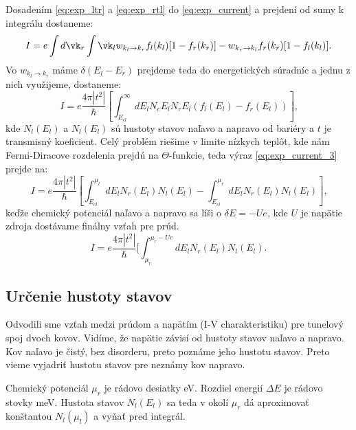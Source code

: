 Dosadením \eqref{eq:exp_ltr} a \eqref{eq:exp_rtl} do \eqref{eq:exp_current} a prejdení od sumy k integrálu dostaneme:
\begin{equation}
\label{eq:exp_current_2}
I=e\int d\vk_r \int \vk_l w_{k_l\to k_r} f_l(k_l)[1-f_r(k_r)] -  w_{k_r\to k_l} f_r(k_r)[1-f_l(k_l)]\text{.}
\end{equation} 
Vo $w_{k_l\to k_r}$ máme $\delta(E_l-E_r)$ prejdeme teda do energetických súradníc a jednu z nich využijeme,
dostaneme:
\begin{equation}
 \label{eq:exp_current_3}
 I=e\frac{4\pi|t^2|}{\hbar}[\int_{E_{cl}}^{\infty}dE_lN_e{E_l}N_r{E_l}(f_l(E_l)-f_r(E_l)) ]\text{,}
\end{equation} 
kde $N_l(E_l)$ a $N_l(E_l)$ sú hustoty stavov naľavo a napravo od bariéry a $t$ je transmisný koeficient. Celý problém riešime v limite nízkych teplôt,
kde nám Fermi-Diracove rozdelenia prejdú na $\Theta$-funkcie, teda výraz \eqref{eq:exp_current_3} prejde na:
\begin{equation}
 \label{eq:exp_current_lt}
 I=e\frac{4\pi|t^2|}{\hbar} [\int_{E_{cl}}^{\mu_l} dE_l 
 N_r(E_l)
 N_l(E_l)
 -\int_{E_{cl}}^{\mu_r}
 dE_l 
 N_r(E_l) N_l(E_l)] \text{,}
\end{equation} 
keďže chemický potenciál naľavo a napravo sa líši o $\delta E=-Ue$, kde $U$ je napätie zdroja dostávame finálny vzťah pre prúd.
\begin{equation}
 \label{eq:exp_current_lt_final} 
  I=e\frac{4\pi|t^2|}{\hbar} [\int_{\mu_r}^{\mu_r-Ue} dE_l N_r(E_l) N_l(E_l)\text{.}
\end{equation} 

\subsection{Určenie hustoty stavov}
Odvodili sme vzťah medzi prúdom a napätím (I-V charakteristiku) pre tunelový spoj dvoch kovov. Vidíme, že napätie závisí 
od hustoty stavov naľavo a napravo. Kov naľavo je čistý, bez disorderu, preto poznáme jeho hustotu stavov. Preto vieme 
vyjadriť hustotu stavov pre neznámy kov napravo. 

Chemický potenciál $\mu_r$ je rádovo desiatky eV. Rozdiel energií $\Delta E$ je rádovo stovky meV. Hustota stavov $N_l(E_l)$ 
sa teda v okolí $\mu_r$ dá aproximovať konštantou $N_l(\mu_l)$ a vyňať pred integrál. 



